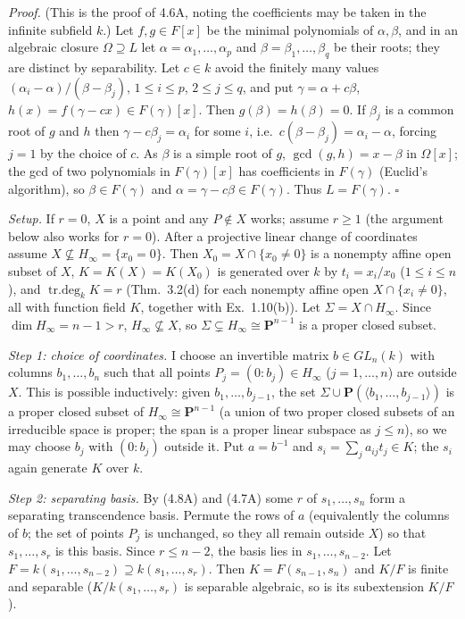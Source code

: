 \documentclass[11pt]{article}
\begin{document}
\emph{Proof.} (This is the proof of 4.6A, noting the coefficients may be taken in the infinite subfield $k$.) Let $f,g\in F[x]$ be the minimal polynomials of $\alpha,\beta$, and in an algebraic closure $\Omega\supseteq L$ let $\alpha=\alpha_1,\dots,\alpha_p$ and $\beta=\beta_1,\dots,\beta_q$ be their roots; they are distinct by separability. Let $c\in k$ avoid the finitely many values $(\alpha_i-\alpha)/(\beta-\beta_j)$, $1\le i\le p$, $2\le j\le q$, and put $\gamma=\alpha+c\beta$, $h(x)=f(\gamma-cx)\in F(\gamma)[x]$. Then $g(\beta)=h(\beta)=0$. If $\beta_j$ is a common root of $g$ and $h$ then $\gamma-c\beta_j=\alpha_i$ for some $i$, i.e.\ $c(\beta-\beta_j)=\alpha_i-\alpha$, forcing $j=1$ by the choice of $c$. As $\beta$ is a simple root of $g$, $\gcd(g,h)=x-\beta$ in $\Omega[x]$; the gcd of two polynomials in $F(\gamma)[x]$ has coefficients in $F(\gamma)$ (Euclid's algorithm), so $\beta\in F(\gamma)$ and $\alpha=\gamma-c\beta\in F(\gamma)$. Thus $L=F(\gamma)$. $\square$

\smallskip
\emph{Setup.} If $r=0$, $X$ is a point and any $P\notin X$ works; assume $r\ge1$ (the argument below also works for $r=0$). After a projective linear change of coordinates assume $X\not\subseteq H_\infty=\{x_0=0\}$. Then $X_0=X\cap\{x_0\ne0\}$ is a nonempty affine open subset of $X$, $K=K(X)=K(X_0)$ is generated over $k$ by $t_i=x_i/x_0$ ($1\le i\le n$), and $\operatorname{tr.deg}_kK=r$ (Thm.~3.2(d) for each nonempty affine open $X\cap\{x_i\ne0\}$, all with function field $K$, together with Ex.~1.10(b)). Let $\Sigma=X\cap H_\infty$. Since $\dim H_\infty=n-1>r$, $H_\infty\not\subseteq X$, so $\Sigma\subsetneq H_\infty\cong\mathbf P^{n-1}$ is a proper closed subset.

\emph{Step 1: choice of coordinates.} I choose an invertible matrix $b\in GL_n(k)$ with columns $b_1,\dots,b_n$ such that all points $P_j=(0:b_j)\in H_\infty$ ($j=1,\dots,n$) are outside $X$. This is possible inductively: given $b_1,\dots,b_{j-1}$, the set $\Sigma\cup\mathbf P(\langle b_1,\dots,b_{j-1}\rangle)$ is a proper closed subset of $H_\infty\cong\mathbf P^{n-1}$ (a union of two proper closed subsets of an irreducible space is proper; the span is a proper linear subspace as $j\le n$), so we may choose $b_j$ with $(0:b_j)$ outside it. Put $a=b^{-1}$ and $s_i=\sum_ja_{ij}t_j\in K$; the $s_i$ again generate $K$ over $k$.

\emph{Step 2: separating basis.} By (4.8A) and (4.7A) some $r$ of $s_1,\dots,s_n$ form a separating transcendence basis. Permute the rows of $a$ (equivalently the columns of $b$; the set of points $P_j$ is unchanged, so they all remain outside $X$) so that $s_1,\dots,s_r$ is this basis. Since $r\le n-2$, the basis lies in $s_1,\dots,s_{n-2}$. Let $F=k(s_1,\dots,s_{n-2})\supseteq k(s_1,\dots,s_r)$. Then $K=F(s_{n-1},s_n)$ and $K/F$ is finite and separable ($K/k(s_1,\dots,s_r)$ is separable algebraic, so is its subextension $K/F$).
\end{document}

